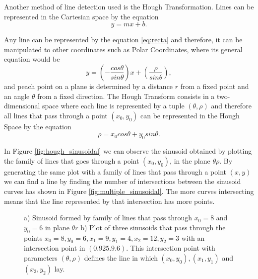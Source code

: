 Another method of line detection used is the Hough Transformation\cite{illingworth1988survey}. Lines can be represented in the Cartesian space by the equation
\begin{equation}
	y=mx+b.
	\label{eq:recta}
\end{equation}

Any line can be represented by the equation \ref{eq:recta} and therefore, it can be manipulated to other coordinates such as Polar Coordinates, where its general equation would be
\begin{equation}
	y=\left( -\frac{cos \theta}{sin \theta} \right) x + \left(\frac{\rho}{sin \theta}\right),
\end{equation}
and peach point on a plane is determined by a distance $r$ from a fixed point and an angle $\theta$ from a fixed direction.
The Hough Transform consists in a two-dimensional space where each line is represented by a tuple $(\theta,\rho)$ and therefore all lines that pass through a point $(x_{0}, y_{0})$ can be represented in the Hough Space by the equation
\begin{equation}
\rho = x_{0}cos\theta + y_{0}sin\theta.
\label{eq:hough_eq}
\end{equation}

In Figure \ref{fig:hough_sinusoidal} we can observe the sinusoid obtained by plotting the family of lines that goes through a point $(x_{0}, y_{0})$, in the plane $\theta \rho$. By generating the same plot with a family of lines that pass through a point $(x, y)$ we can find a line by finding the number of intersections between the sinusoid curves has shown in Figure \ref{fig:multiple_sinusoidal}. The more curves intersecting means that the line represented by that intersection has more points\cite{OCV}.
\begin{figure}[htbp]
	\centering
  \caption{a) Sinusoid formed by family of lines that pass through $x_{0} =8$ and $y_{0} = 6$ in plane $\theta r$ b) Plot of three sinusoids that pass through the points $x_{0} = 8,y_{0} = 6, x_{1} = 9,y_{1} = 4, x_{2} = 12, y_{2} = 3$ with an intersection point in $(0.925.9.6)$. This intersection point with parameters $(\theta,\rho)$ defines the line in which $(x_{0},y_{0}), (x_{1},y_{1})$ and $(x_{2},y_{2})$ lay\cite{OCV}.}
\end{figure}

